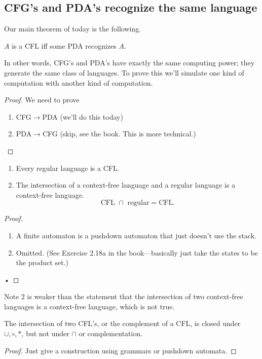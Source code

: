 \subsection{CFG's and PDA's recognize the same language}
Our main theorem of today is the following.
\begin{thm}
$A$ is a CFL iff some PDA recognizes $A$.
\end{thm}
In other words, CFG's and PDA's have exactly the same computing power; they generate the same class of languages. To prove this we'll simulate one kind of computation with another kind of computation.
\begin{proof}
We need to prove
\begin{enumerate}
\item
CFG$\to$PDA (we'll do this today)
\item
PDA$\to$CFG (skip, see the book. This is more technical.) %
\end{enumerate}
\end{proof}
\begin{cor}
\begin{enumerate}
\item
Every regular language is a CFL.
\item
The intersection of a context-free language and a regular language is a context-free language.
\[
\text{CFL }\cap\text{ regular}=\text{CFL}. 
\]
\end{enumerate}
\end{cor}
\begin{proof}
\begin{enumerate}
\item
A finite automaton is a pushdown automaton that just doesn't use the stack.
\item  Omitted. (See Exercise 2.18a in the book---basically just take the states to be the product set.)
\end{enumerate}•
\end{proof}
Note 2 is weaker than the statement that the intersection of two context-free languages is a context-free language, which is not true.
\begin{pr}
The intersection of two CFL's, or the complement of a CFL, is closed under $\cup,\circ,*$, but not under $\cap$ or complementation.
\end{pr}
\begin{proof}
Just give a construction using grammars or pushdown automata.
\end{proof}
